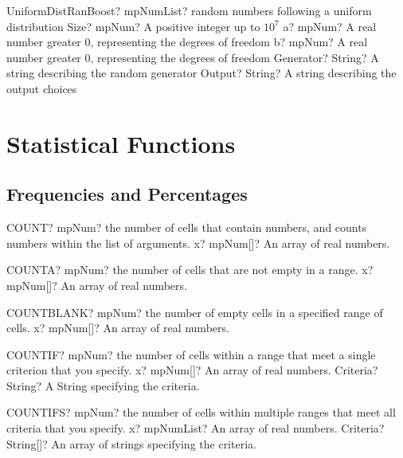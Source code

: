 \documentclass[12pt,a4paper,openany]{book}
\begin{document}
\begin{mpFunctionsExtract}
\mpFunctionFiveNotImplemented
{UniformDistRanBoost? mpNumList? random numbers following a uniform distribution}
{Size? mpNum? A positive integer up to $10^7$}
{a? mpNum? A real number greater 0, representing the degrees of freedom}
{b? mpNum? A real number greater 0, representing the degrees of freedom}
{Generator? String? A string describing the random generator}
{Output? String? A string describing the output choices}
\end{mpFunctionsExtract}

\chapter{Statistical Functions}

\section{Frequencies and Percentages}

\begin{mpFunctionsExtract}
\mpWorksheetFunctionOneNotImplemented
{COUNT? mpNum? the number of cells that contain numbers, and counts numbers within the list of arguments.}
{x? mpNum[]? An array of real numbers.}
\end{mpFunctionsExtract}

\begin{mpFunctionsExtract}
\mpWorksheetFunctionOneNotImplemented
{COUNTA? mpNum? the number of cells that are not empty in a range.}
{x? mpNum[]? An array of real numbers.}
\end{mpFunctionsExtract}

\begin{mpFunctionsExtract}
\mpWorksheetFunctionOneNotImplemented
{COUNTBLANK? mpNum? the number of empty cells in a specified range of cells.}
{x? mpNum[]? An array of real numbers.}
\end{mpFunctionsExtract}

\begin{mpFunctionsExtract}
\mpWorksheetFunctionTwoNotImplemented
{COUNTIF? mpNum? the number of cells within a range that meet a single criterion that you specify.}
{x? mpNum[]? An array of real numbers.}
{Criteria? String? A String specifying the criteria.}
\end{mpFunctionsExtract}

\begin{mpFunctionsExtract}
\mpWorksheetFunctionTwoNotImplemented
{COUNTIFS? mpNum? the number of cells within multiple ranges that meet all criteria that you specify.}
{x? mpNumList? An array of real numbers.}
{Criteria? String[]? An array of strings specifying the criteria.}
\end{mpFunctionsExtract}
\end{document}

